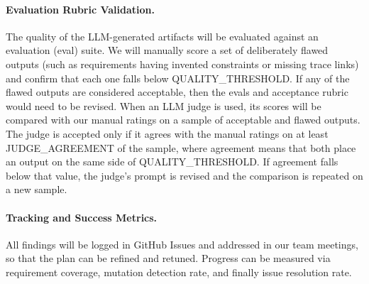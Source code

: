\documentclass[12pt, titlepage]{article}
\begin{document}
\paragraph{Evaluation Rubric Validation.}
The quality of the LLM-generated artifacts will be evaluated against an evaluation (eval) suite. We will manually score a set of deliberately flawed outputs (such as requirements having invented constraints or missing trace links) and confirm that each one falls below QUALITY\_THRESHOLD. If any of the flawed outputs are considered acceptable, then the evals and acceptance rubric would need to be revised. When an LLM judge is used, its scores will be compared with our manual ratings on a sample of acceptable and flawed outputs. The judge is accepted only if it agrees with the manual ratings on at least JUDGE\_AGREEMENT of the sample, where agreement means that both place an output on the same side of QUALITY\_THRESHOLD. If agreement falls below that value, the judge's prompt is revised and the comparison is repeated on a new sample.

\paragraph{Tracking and Success Metrics.}
All findings will be logged in GitHub Issues and addressed in our team meetings, so that the plan can be refined and retuned. Progress can be measured via requirement coverage, mutation detection rate, and finally issue resolution rate.
\end{document}
